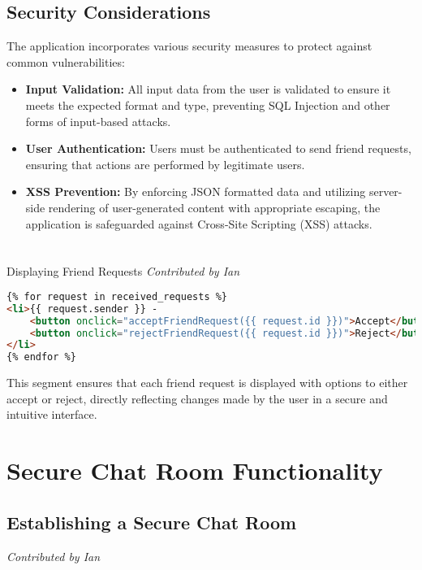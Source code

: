 \documentclass{article}
\begin{document}
\subsection*{Security Considerations}
The application incorporates various security measures to protect against common vulnerabilities:

\begin{itemize}
    \item \textbf{Input Validation:} All input data from the user is validated to ensure it meets the expected format and type, preventing SQL Injection and other forms of input-based attacks.
    \item \textbf{User Authentication:} Users must be authenticated to send friend requests, ensuring that actions are performed by legitimate users.
    \item \textbf{XSS Prevention:} By enforcing JSON formatted data and utilizing server-side rendering of user-generated content with appropriate escaping, the application is safeguarded against Cross-Site Scripting (XSS) attacks.
\end{itemize}

\section{}{Displaying Friend Requests}
\textit{Contributed by Ian}

\begin{lstlisting}[language=HTML, caption={Displaying Friend Requests in Jinja2 Template}]
{% for request in received_requests %}
<li>{{ request.sender }} - 
    <button onclick="acceptFriendRequest({{ request.id }})">Accept</button> 
    <button onclick="rejectFriendRequest({{ request.id }})">Reject</button>
</li>
{% endfor %}
\end{lstlisting}

This segment ensures that each friend request is displayed with options to either accept or reject, directly reflecting changes made by the user in a secure and intuitive interface.

\section{Secure Chat Room Functionality}

\subsection*{Establishing a Secure Chat Room}
\textit{Contributed by Ian}
\end{document}
